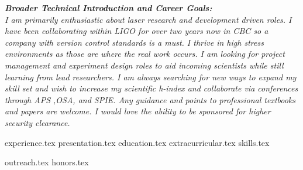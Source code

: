 \documentclass[11pt, a4paper]{awesome-cv}
\newcommand*{\sectiondir}{cv/}
\begin{document}
\makecvheader

\vspace{1.0mm}
\begin{justify}
\bodyfont\itshape\color{darktext}
\textbf{Broader Technical Introduction and Career Goals:} \\ 
I am primarily enthusiastic about laser research and development driven roles. I have been collaborating within LIGO for over two years now in CBC so a company with version control standards is a must. I thrive in high stress environments as those are where the real work occurs. I am looking for project management and experiment design roles to aid incoming scientists while still learning from lead researchers. I am always searching for new ways to expand my skill set and wish to increase my scientific h-index and collaborate via conferences through APS ,OSA, and SPIE. Any guidance and points to professional textbooks and papers are welcome. I would love the ability to be sponsored for higher security clearance.   
\end{justify}
\vspace{1.0mm}

{experience.tex}
{presentation.tex}
{education.tex} 
{extracurricular.tex}
{skills.tex} 

\vspace{3.0mm}
{outreach.tex}
\vspace{3.0mm}
{honors.tex}
\end{document}
